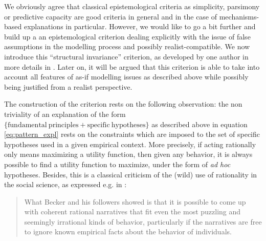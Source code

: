 \documentclass[a4paper,11pt]{article}
\theoremstyle{definition}
\begin{document}
We obviously agree that classical epistemological criteria as simplicity, parsimony or predictive capacity are good criteria in general and in the case of mechanisms-based explanations in particular. However, we would like to go a bit further and build up a an epistemological criterion dealing explicitly with the issue of false assumptions in the modelling process and possibly realist-compatible. We now introduce this ``structural invariance'' criterion, as developed by one author in more details in \citep{attard_rationality}. Later on, it will be argued that this criterion is able to take into account all features of as-if modelling issues as described above while possibly being justified from a realist perspective.

The construction of the criterion rests on the following observation: the non triviality of an explanation of the form $\{\mathrm{fundamental~principles + specific~hypotheses}\}$ as described above in equation \eqref{eq:pattern_expl} rests on the constraints which are imposed to the set of specific hypotheses used in a given empirical context. More precisely, if acting rationally only means maximizing a utility function, then given any behavior, it is always possible to find a utility function to maximize, under the form of \textit{ad hoc} hypotheses. Besides, this is a classical criticism of the (wild) use of rationality in the social science, as expressed e.g. in \citep[p.~498]{Hedstroem2021}:
\begin{quote}
What Becker and his followers showed is that it is possible to come up with coherent rational narratives that fit even the most puzzling and seemingly irrational kinds of behavior, particularly if the narratives are free to ignore known empirical facts about the behavior of individuals.
\end{quote}
\end{document}
